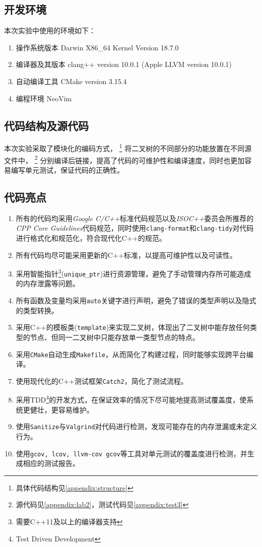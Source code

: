 \subsection{开发环境}
本次实验中使用的环境如下：
\begin{enumerate}
    \item 操作系统版本 Darwin X86\_64 Kernel Version 18.7.0
    \item 编译器及其版本 clang++ version 10.0.1 (Apple LLVM version 10.0.1)
    \item 自动编译工具 CMake version 3.15.4
    \item 编程环境 NeoVim
\end{enumerate}
\subsection{代码结构及源代码}
本次实验采取了模块化的编码方式，
\footnote{具体代码结构见\autoref{appendix:structure}}
将二叉树的不同部分的功能放置在不同源文件中，
\footnote{源代码见\autoref{appendix:lab2}，测试代码见\autoref{appendix:test3}}
分别编译后链接，提高了代码的可维护性和编译速度，同时也更加容易编写单元测试，保证代码的正确性。
\subsection{代码亮点}
\begin{enumerate}
        \item 所有的代码均采用\emph{Google
            C/C++}标准代码规范以及\emph{ISOC++}委员会所推荐的\emph{CPP Core Guidelines}代码规范，同时使用\texttt{clang-format}和\texttt{clang-tidy}对代码进行格式化和规范化，符合现代化C++的规范。
        \item 所有代码均尽可能采用更新的C++标准，以提高可维护性以及可读性。
        \item 采用智能指针\footnote{需要C++11及以上的编译器支持}(\texttt{unique\_ptr})进行资源管理，避免了手动管理内存所可能造成的内存泄露等问题。
        \item 所有函数及变量均采用\texttt{auto}关键字进行声明，避免了错误的类型声明以及隐式的类型转换。
        \item 采用C++的模板类(\texttt{template})来实现二叉树，体现出了二叉树中能存放任何类型的节点、但同一二叉树中只能存放单一类型节点的特点。
        \item 采用\texttt{CMake}自动生成\texttt{Makefile}，从而简化了构建过程，同时能够实现跨平台编译。
        \item 使用现代化的C++测试框架\texttt{Catch2}，简化了测试流程。
        \item 采用TDD\footnote{Test Driven Development}的开发方式，在保证效率的情况下尽可能地提高测试覆盖度，使系统更健壮，更容易维护。
        \item 使用\texttt{Sanitize}与\texttt{Valgrind}对代码进行检测，发现可能存在的内存泄漏或未定义行为。
        \item 使用\texttt{gcov, lcov, llvm-cov gcov}等工具对单元测试的覆盖度进行检测，并生成相应的测试报告。
\end{enumerate}

